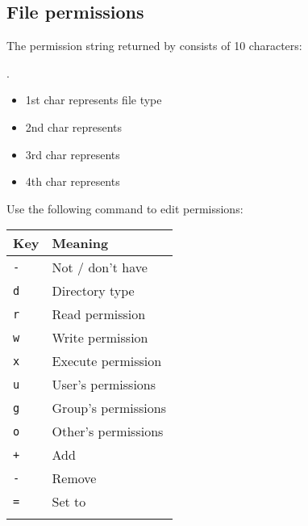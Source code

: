 \documentclass{article}
\begin{document}
\subsection{File permissions}
\begin{minipage}{0.7\textwidth}
      The permission string returned by  consists of 10 characters:

      .
      \begin{itemize}
            \item 1st char represents file type 
            \item 2nd char represents 
            \item 3rd char represents 
            \item 4th char represents 
      \end{itemize}
      Use the following command to edit permissions:

\end{minipage}
\begin{minipage}{0.25\textwidth}
      \begin{table}[H]
            \begin{tabular}{ll}
                  \textbf{Key}  & \textbf{Meaning}    \\ \hline
                  \lstinline|-| & Not / don't have    \\ \arrayrulecolor{lightgray}\hline
                  \lstinline|d| & Directory type      \\ \arrayrulecolor{lightgray}\hline
                  \lstinline|r| & Read permission     \\ \arrayrulecolor{lightgray}\hline
                  \lstinline|w| & Write permission    \\ \arrayrulecolor{lightgray}\hline
                  \lstinline|x| & Execute permission  \\ \arrayrulecolor{lightgray}\hline
                  \lstinline|u| & User's permissions  \\ \arrayrulecolor{lightgray}\hline
                  \lstinline|g| & Group's permissions \\ \arrayrulecolor{lightgray}\hline
                  \lstinline|o| & Other's permissions \\ \arrayrulecolor{lightgray}\hline
                  \lstinline|+| & Add                 \\ \arrayrulecolor{lightgray}\hline
                  \lstinline|-| & Remove              \\ \arrayrulecolor{lightgray}\hline
                  \lstinline|=| & Set to              \\ \arrayrulecolor{lightgray}\hline
            \end{tabular}
      \end{table}

\end{minipage}
\end{document}
